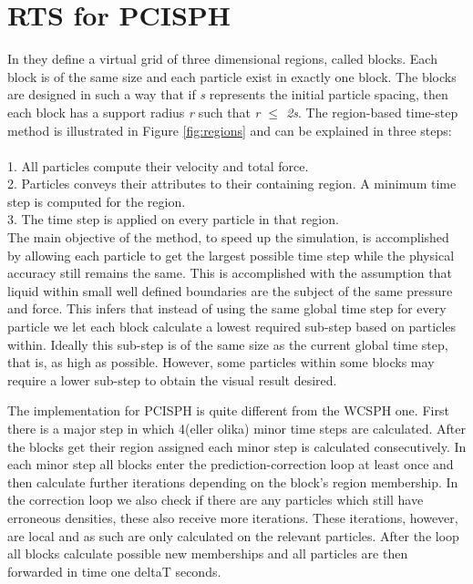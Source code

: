 \documentclass[../../main.tex]{subfiles}
\begin{document}
\section{RTS for PCISPH}
In \cite{goswami2014regional} they define a virtual grid of three dimensional regions, called blocks. Each block is of the same size and each particle exist in exactly one block. The blocks are designed in such a way that if \textit{s} represents the initial particle spacing, then each block has a support radius \textit{r} such that \textit{r $\leq$ 2s}. The region-based time-step method is illustrated in Figure \ref{fig:regions} and can be explained in three steps:
\\
\\1. All particles compute their velocity and total force.
\\2. Particles conveys their attributes to their containing region. A minimum time step is computed for the region.
\\3. The time step is applied on every particle in that region. 
\\
The main objective of the method, to speed up the simulation, is accomplished by allowing each particle to get the largest possible time step while the physical accuracy still remains the same. This is accomplished with the assumption that liquid within small well defined boundaries are the subject of the same pressure and force. This infers that instead of using the same global time step for every particle we let each block calculate a lowest required sub-step based on particles within. Ideally this sub-step is of the same size as the current global time step, that is, as high as possible. However, some particles within some blocks may require a lower sub-step to obtain the visual result desired. 

The implementation for PCISPH is quite different from the WCSPH one. First there is a major step in which 4(eller olika) minor time steps are calculated. After the blocks get their region assigned each minor step is calculated consecutively. In each minor step all blocks enter the prediction-correction loop at least once and then calculate further iterations depending on the block's region membership. In the correction loop we also check if there are any particles which still have erroneous densities, these also receive more iterations. These iterations, however, are local and as such are only calculated on the relevant particles. After the loop all blocks calculate possible new memberships and all particles are then forwarded in time one deltaT seconds. 
\end{document}
